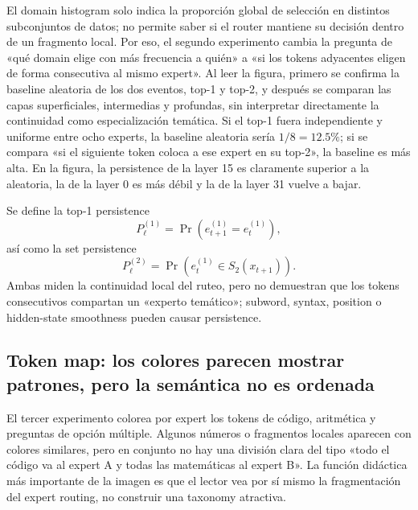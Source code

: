 El domain histogram solo indica la proporción global de selección en distintos subconjuntos de datos; no permite saber si el router mantiene su decisión dentro de un fragmento local. Por eso, el segundo experimento cambia la pregunta de «qué domain elige con más frecuencia a quién» a «si los tokens adyacentes eligen de forma consecutiva al mismo expert». Al leer la figura, primero se confirma la baseline aleatoria de los dos eventos, top-1 y top-2, y después se comparan las capas superficiales, intermedias y profundas, sin interpretar directamente la continuidad como especialización temática. Si el top-1 fuera independiente y uniforme entre ocho experts, la baseline aleatoria sería $1/8=12.5\%$; si se compara «si el siguiente token coloca a ese expert en su top-2», la baseline es más alta. En la figura, la persistence de la layer 15 es claramente superior a la aleatoria, la de la layer 0 es más débil y la de la layer 31 vuelve a bajar.


Se define la top-1 persistence
\[
P_{\ell}^{(1)}=\Pr\!\left(e_{t+1}^{(1)}=e_t^{(1)}\right),
\]
así como la set persistence
\[
P_{\ell}^{(2)}=\Pr\!\left(e_t^{(1)}\in S_2(x_{t+1})\right).
\]
Ambas miden la continuidad local del ruteo, pero no demuestran que los tokens consecutivos compartan un «experto temático»; subword, syntax, position o hidden-state smoothness pueden causar persistence.


\subsection{Token map: los colores parecen mostrar patrones, pero la semántica no es ordenada}

El tercer experimento colorea por expert los tokens de código, aritmética y preguntas de opción múltiple. Algunos números o fragmentos locales aparecen con colores similares, pero en conjunto no hay una división clara del tipo «todo el código va al expert A y todas las matemáticas al expert B». La función didáctica más importante de la imagen es que el lector vea por sí mismo la fragmentación del expert routing, no construir una taxonomy atractiva.

